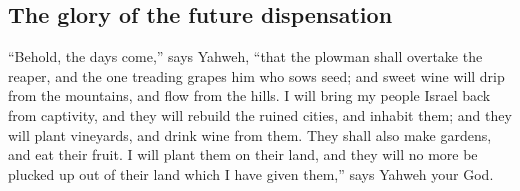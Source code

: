 \hypertarget{the-glory-of-the-future-dispensation}{%
\subsection{The glory of the future
dispensation}\label{the-glory-of-the-future-dispensation}}

 ``Behold, the days come,'' says Yahweh, ``that the
plowman shall overtake the reaper, and the one treading grapes him who
sows seed; and sweet wine will drip from the mountains, and flow from
the hills.  I will bring my people Israel back from
captivity, and they will rebuild the ruined cities, and inhabit them;
and they will plant vineyards, and drink wine from them. They shall also
make gardens, and eat their fruit.  I will plant them on
their land, and they will no more be plucked up out of their land which
I have given them,'' says Yahweh your God.
